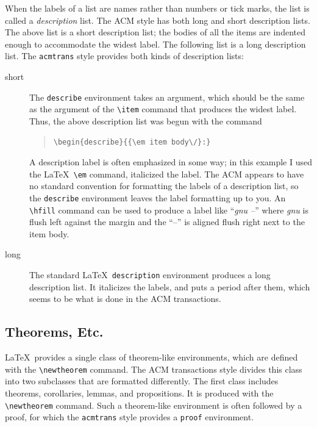 \documentclass[acmtocl]{acmtrans2m}
\begin{document}
When the labels of a list are names rather than numbers or tick marks,
the list is called a {\em description\/} list.
The ACM style
has both long and short description lists.  The above list is a short
description list; the bodies of all the items are indented enough to
accommodate the widest label.
The following list is a long description list.
The {\tt acmtrans} style provides both kinds of description lists:
\begin{description}
\item[short]
The {\tt describe} environment 
takes an argument, which should be the same as the argument of the 
\verb|\item|
command that produces the widest label.  Thus, the above description
list was begun with the command
\begin{quote}
\begin{verbatim}
\begin{describe}{{\em item body\/}:}
\end{verbatim}
\end{quote}

A description label is often emphasized in some way; in this example I
used the \LaTeX\ \verb|\em| command, italicized the label.  The ACM
appears to have no standard convention for formatting the labels of a
description list, so the {\tt describe} environment leaves the label
formatting up to you.  An \verb|\hfill| command can be used to produce
a label like ``{\em gnu \hfill --\/}'' where {\em gnu\/} is flush left
against the margin and the ``--'' is aligned flush right next to the
item body.

\item[long]
The standard \LaTeX\ {\tt description} environment produces a long
description list.  It italicizes the labels, and puts a period after
them, which seems to be what is done in the ACM transactions.
\end{description}

\subsection{Theorems, Etc.}


\LaTeX\ provides a single class of theorem-like environments, which 
are
defined with the \verb|\newtheorem| command.  
The ACM transactions
style divides this class into two subclasses that are formatted
differently.  The first class includes theorems, corollaries, lemmas,
and propositions.  It is produced with the \verb|\newtheorem| command.
Such a theorem-like environment is often followed by a proof, for 
which
the {\tt acmtrans} style provides a {\tt proof} environment.
\end{document}
